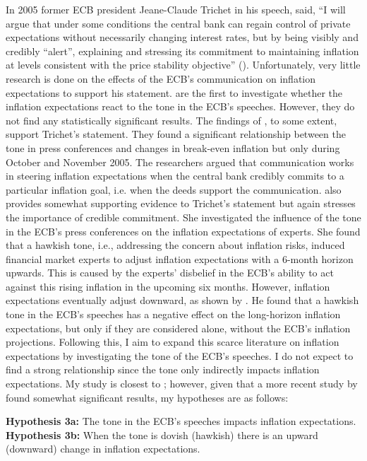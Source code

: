 In 2005 former ECB president Jeane-Claude Trichet in his speech, said, “I will argue that under some conditions the central bank can regain control of private expectations without necessarily changing interest rates, but by being visibly and credibly “alert”, explaining and stressing its commitment to maintaining inflation at levels consistent with the price stability objective” (\cite{europeancentralbank2005}). Unfortunately, very little research is done on the effects of the ECB’s communication on inflation expectations to support his statement. \textcite{ehrmann2007} are the first to investigate whether the inflation expectations react to the tone in the ECB’s speeches. However, they do not find any statistically significant results. The findings of \textcite{jansen2007}, to some extent, support Trichet’s statement. They found a significant relationship between the tone in press conferences and changes in break-even inflation but only during October and November 2005. The researchers argued that communication works in steering inflation expectations when the central bank credibly commits to a particular inflation goal, i.e. when the deeds support the communication. \textcite{ullrich2008} also provides somewhat supporting evidence to Trichet’s statement but again stresses the importance of credible commitment. She investigated the influence of the tone in the ECB’s press conferences on the inflation expectations of experts. She found that a hawkish tone, i.e., addressing the concern about inflation risks, induced financial market experts to adjust inflation expectations with a 6-month horizon upwards. This is caused by the experts’ disbelief in the ECB’s ability to act against this rising inflation in the upcoming six months. However, inflation expectations eventually adjust downward, as shown by \textcite{hubert2017}. He found that a hawkish tone in the ECB’s speeches has a negative effect on the long-horizon inflation expectations, but only if they are considered alone, without the ECB’s inflation projections. Following this, I aim to expand this scarce literature on inflation expectations by investigating the tone of the ECB’s speeches. I do not expect to find a strong relationship since the tone only indirectly impacts inflation expectations. My study is closest to \textcite{ehrmann2007}; however, given that a more recent study by \textcite{hubert2017} found somewhat significant results, my hypotheses are as follows:


\textbf{Hypothesis 3a:} The tone in the ECB’s speeches impacts inflation expectations.\\
\textbf{Hypothesis 3b:} When the tone is dovish (hawkish) there is an upward (downward) change in inflation expectations.


